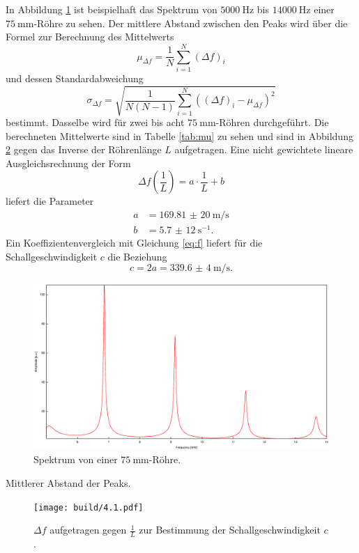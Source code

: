 In Abbildung \ref{fig:Spek4_1} ist beispielhaft das Spektrum von  $\SI{5000}{\hertz}$ bis $\SI{14000}{\hertz}$ einer $\SI{75}{\milli\meter}$-Röhre zu sehen.
Der mittlere Abstand zwischen den Peaks wird über die Formel zur Berechnung des Mittelwerts
\[
\mu_{\Delta f} = \frac{1}{N}\sum_{i=1}^{N}(\Delta f)_i
\]
und dessen Standardabweichung
\[
\sigma_{\Delta f} = \sqrt{\frac{1}{N(N-1)}\sum_{i=1}^{N}((\Delta f)_i-\mu_{\Delta f})^2}
\]
bestimmt. Dasselbe wird für zwei bis acht $\SI{75}{\milli\meter}$-Röhren durchgeführt. Die berechneten Mittelwerte sind in Tabelle
\ref{tab:mu} zu sehen und sind in Abbildung \ref{fig:Df_L} gegen das Inverse der Röhrenlänge $L$ aufgetragen. Eine nicht gewichtete lineare Ausgleichsrechnung der Form 
\[
\Delta f\left(\frac{1}{L}\right)= a\cdot\frac{1}{L}+b
\]
liefert die Parameter
\begin{align*}
a&=\SI{169,81(20)}{\meter\per\second}\\
b&=\SI{5,7(12)}{\second^{-1}}\text{.}
\end{align*}
Ein Koeffizientenvergleich mit Gleichung \eqref{eq:f} liefert für die Schallgeschwindigkeit $c$ die Beziehung
\[
c=2 a=\SI{339,6(4)}{\meter\per\second}\text{.}
\]

\begin{figure}
\centering
\includegraphics[width=\linewidth-60pt,height=\textheight-60pt,keepaspectratio]{FP-V23data/4.1_75mm.eps}
\caption{Spektrum von einer $\SI{75}{\milli\meter}$-Röhre.}
\label{fig:Spek4_1}
\end{figure}

\begin{table}
\caption{Mittlerer Abstand der Peaks.}
\centering

\label{tab:mu}
\end{table}

\begin{figure}
\centering
\texttt{[image: build/4.1.pdf]}
\caption{$\Delta f$ aufgetragen gegen $\frac{1}{L}$ zur Bestimmung der Schallgeschwindigkeit $c$.}
\label{fig:Df_L}
\end{figure}

